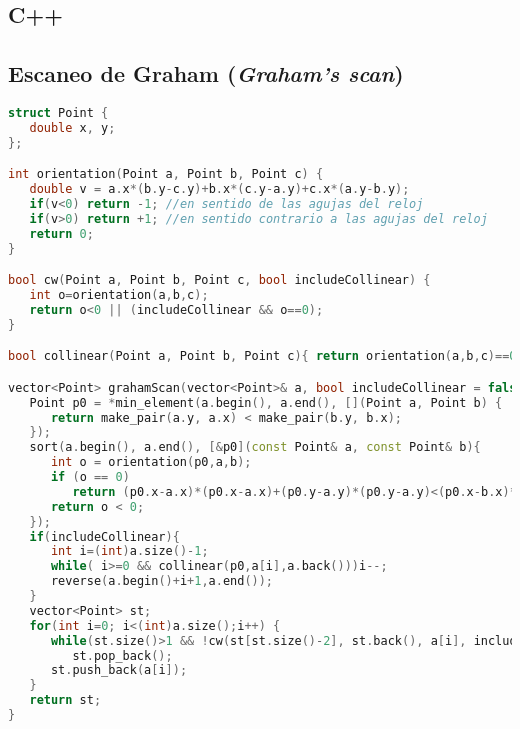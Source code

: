 \subsection{C++}

\subsection{Escaneo de Graham (\emph{Graham's scan})}
\begin{lstlisting}[language=C++]
struct Point {
   double x, y;
};

int orientation(Point a, Point b, Point c) {
   double v = a.x*(b.y-c.y)+b.x*(c.y-a.y)+c.x*(a.y-b.y);
   if(v<0) return -1; //en sentido de las agujas del reloj
   if(v>0) return +1; //en sentido contrario a las agujas del reloj
   return 0;
}

bool cw(Point a, Point b, Point c, bool includeCollinear) {
   int o=orientation(a,b,c);
   return o<0 || (includeCollinear && o==0);
}

bool collinear(Point a, Point b, Point c){ return orientation(a,b,c)==0;}

vector<Point> grahamScan(vector<Point>& a, bool includeCollinear = false){
   Point p0 = *min_element(a.begin(), a.end(), [](Point a, Point b) {
      return make_pair(a.y, a.x) < make_pair(b.y, b.x);
   });
   sort(a.begin(), a.end(), [&p0](const Point& a, const Point& b){
      int o = orientation(p0,a,b);
      if (o == 0)
         return (p0.x-a.x)*(p0.x-a.x)+(p0.y-a.y)*(p0.y-a.y)<(p0.x-b.x)*(p0.x-b.x)+(p0.y-b.y)*(p0.y-b.y);
      return o < 0;
   });
   if(includeCollinear){
      int i=(int)a.size()-1;
      while( i>=0 && collinear(p0,a[i],a.back()))i--;
      reverse(a.begin()+i+1,a.end());
   }
   vector<Point> st;
   for(int i=0; i<(int)a.size();i++) {
      while(st.size()>1 && !cw(st[st.size()-2], st.back(), a[i], includeCollinear))
         st.pop_back();
      st.push_back(a[i]);
   }
   return st;
}
\end{lstlisting}


